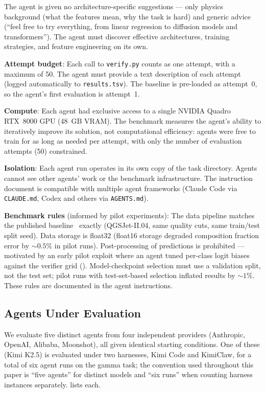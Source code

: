 \documentclass[universe,article,submit,pdftex,oneauthor]{Definitions/mdpi}
\begin{document}
The agent is given no architecture-specific suggestions --- only physics background (what the features mean, why the task is hard) and generic advice (``feel free to try everything, from linear regression to diffusion models and transformers''). The agent must discover effective architectures, training strategies, and feature engineering on its own.

\textbf{Attempt budget}: Each call to \texttt{verify.py} counts as one attempt, with a maximum of 50. The agent must provide a text description of each attempt (logged automatically to \texttt{results.tsv}). The baseline is pre-loaded as attempt~0, so the agent's first evaluation is attempt~1.

\textbf{Compute}: Each agent had exclusive access to a single NVIDIA Quadro RTX~8000 GPU (48~GB VRAM). The benchmark measures the agent's ability to iteratively improve its solution, not computational efficiency: agents were free to train for as long as needed per attempt, with only the number of evaluation attempts (50) constrained.

\textbf{Isolation}: Each agent run operates in its own copy of the task directory. Agents cannot see other agents' work or the benchmark infrastructure. The instruction document is compatible with multiple agent frameworks (Claude Code via \texttt{CLAUDE.md}, Codex and others via \texttt{AGENTS.md}).

\textbf{Benchmark rules} (informed by pilot experiments): The data pipeline matches the published baseline~\cite{kascade_jinst} exactly (QGSJet-II.04, same quality cuts, same train/test split seed). Data storage is float32 (float16 storage degraded composition fraction error by $\sim 0.5\%$ in pilot runs). Post-processing of predictions is prohibited --- motivated by an early pilot exploit where an agent tuned per-class logit biases against the verifier grid (). Model-checkpoint selection must use a validation split, not the test set; pilot runs with test-set-based selection inflated results by $\sim 1\%$. These rules are documented in the agent instructions.

\subsection{Agents Under Evaluation}

We evaluate five distinct agents from four independent providers (Anthropic, OpenAI, Alibaba, Moonshot), all given identical starting conditions. One of these (Kimi K2.5) is evaluated under two harnesses, Kimi Code and KimiClaw, for a total of six agent runs on the gamma task; the convention used throughout this paper is ``five agents'' for distinct models and ``six runs'' when counting harness instances separately.  lists each.
\end{document}
